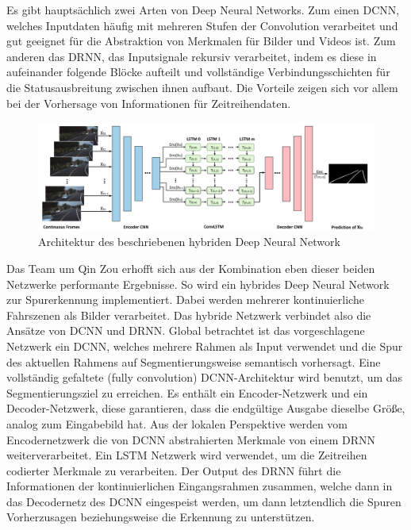 Es gibt hauptsächlich zwei Arten von Deep Neural Networks. Zum einen \ac{DCNN}, welches Inputdaten häufig mit mehreren Stufen der Convolution verarbeitet und gut geeignet für die Abstraktion von Merkmalen für Bilder und Videos ist. Zum anderen das \ac{DRNN}, das Inputsignale rekursiv verarbeitet, indem es diese in aufeinander folgende Blöcke aufteilt und vollständige Verbindungsschichten für die Statusausbreitung zwischen ihnen aufbaut. Die Vorteile zeigen sich vor allem bei der Vorhersage von Informationen für Zeitreihendaten.\cite{cnnld_2020}


\begin{figure}[H]
    \centering
    \includegraphics[scale=0.4]{./img/LD_architecture_combined_network.png}
    \caption{Architektur des beschriebenen hybriden Deep Neural Network \cite[S.1]{cnnld_2020}}
    \label{fig:LDHybridDNN}
\end{figure}


Das Team um Qin Zou \cite{cnnld_2020} erhofft sich aus der Kombination eben dieser beiden Netzwerke performante Ergebnisse. So wird ein hybrides Deep Neural Network zur Spurerkennung implementiert. Dabei werden mehrerer kontinuierliche Fahrszenen als Bilder verarbeitet. Das hybride Netzwerk verbindet also die Ansätze von \ac{DCNN} und \ac{DRNN}.
Global betrachtet ist das vorgeschlagene Netzwerk ein \ac{DCNN}, welches mehrere Rahmen als Input verwendet und die Spur des aktuellen Rahmens auf Segmentierungsweise semantisch vorhersagt.
Eine vollständig gefaltete (fully convolution) DCNN-Architektur wird benutzt, um das Segmentierungsziel zu erreichen. Es enthält ein Encoder-Netzwerk und ein Decoder-Netzwerk, diese garantieren, dass die endgültige Ausgabe dieselbe Größe, analog zum Eingabebild hat. Aus der lokalen Perspektive werden vom Encodernetzwerk die von DCNN abstrahierten Merkmale von einem DRNN weiterverarbeitet. Ein \ac{LSTM} Netzwerk wird verwendet, um die Zeitreihen codierter Merkmale zu verarbeiten. Der Output des DRNN führt die Informationen der kontinuierlichen Eingangsrahmen zusammen, welche dann in das Decodernetz des DCNN eingespeist werden, um dann letztendlich die Spuren Vorherzusagen beziehungsweise die Erkennung zu unterstützen. \cite{cnnld_2020}


